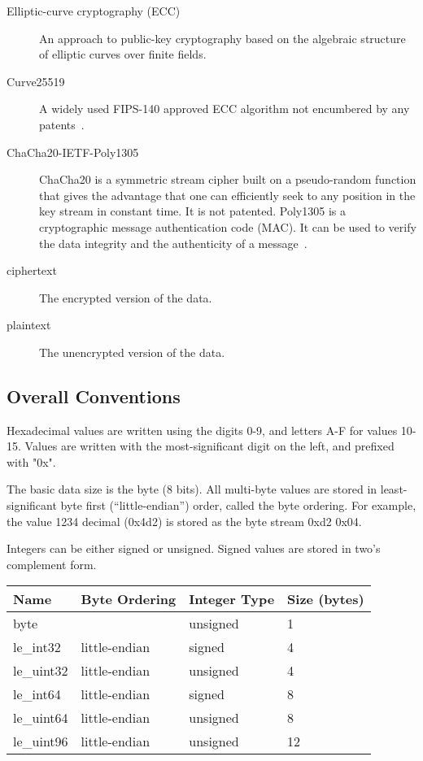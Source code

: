 \begin{description}
\item[Elliptic-curve cryptography (ECC)] %
  An approach to public-key cryptography based on the algebraic structure of elliptic curves over finite fields.
\item[Curve25519] %
  A widely used FIPS-140 approved ECC algorithm not encumbered by any patents~\cite{RFC7748}.
\item[ChaCha20-IETF-Poly1305] %
  ChaCha20 is a symmetric stream cipher built on a pseudo-random function that gives the advantage that one can efficiently seek to any position in the key stream in constant time.
  It is not patented.
  Poly1305 is a cryptographic message authentication code (MAC).
  It can be used to verify the data integrity and the authenticity of a message~\cite{RFC8439}.
\item[ciphertext] %
  The encrypted version of the data.
\item[plaintext] %
  The unencrypted version of the data.
\end{description}

\subsection{Overall Conventions}

Hexadecimal values are written using the digits 0-9, and letters A-F for values 10-15.
%
Values are written with the most-significant digit on the left, and prefixed with "0x".

The basic data size is the byte (8 bits).
%
All multi-byte values are stored in least-significant byte first (``little-endian'') order, called the byte ordering.
%
For example, the value 1234 decimal (0x4d2) is stored as the byte stream 0xd2 0x04.

Integers can be either signed or unsigned.
%
Signed values are stored in two's complement form.

\begin{center}
\begin{tabular}{l l l l}
\hline
\textbf{Name} & \textbf{Byte Ordering} & \textbf{Integer Type} & \textbf{Size (bytes)} \\
\hline
byte & & unsigned & 1 \\
le\_int32 & little-endian & signed & 4 \\
le\_uint32 & little-endian & unsigned & 4 \\
le\_int64 & little-endian & signed & 8 \\
le\_uint64 & little-endian & unsigned & 8 \\
le\_uint96 & little-endian & unsigned & 12 \\
\end{tabular}
\end{center}

